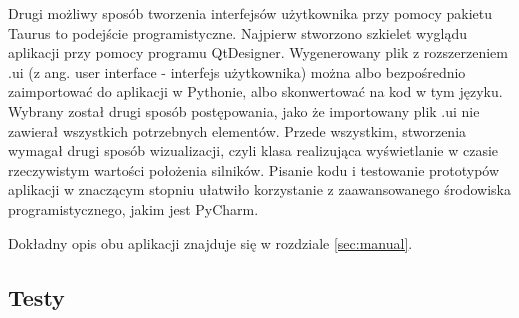 Drugi możliwy sposób tworzenia interfejsów użytkownika przy pomocy pakietu Taurus to podejście programistyczne. Najpierw stworzono szkielet wyglądu aplikacji przy pomocy programu QtDesigner. Wygenerowany plik z rozszerzeniem .ui (z ang. user interface - interfejs użytkownika) można albo bezpośrednio zaimportować do aplikacji w Pythonie, albo skonwertować na kod w tym języku. Wybrany został drugi sposób postępowania, jako że importowany plik .ui nie zawierał wszystkich potrzebnych elementów. Przede wszystkim, stworzenia wymagał drugi sposób wizualizacji, czyli klasa realizująca wyświetlanie w czasie rzeczywistym wartości położenia silników. Pisanie kodu i testowanie prototypów aplikacji w znaczącym stopniu ułatwiło korzystanie z zaawansowanego środowiska programistycznego, jakim jest PyCharm.

Dokładny opis obu aplikacji znajduje się w rozdziale \ref{sec:manual}.


\subsection{Testy}